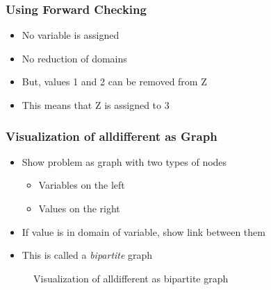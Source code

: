 \begin{frame}
\frametitle{Using Forward Checking}
\begin{itemize}
\item No variable is assigned
\item No reduction of domains
\item But, values 1 and 2 can be removed from Z
\item This means that Z is assigned to 3
\end{itemize}
\end{frame}

\begin{frame}
\frametitle{Visualization of alldifferent as Graph}
\begin{itemize}
\item Show problem as graph with two types of nodes
\begin{itemize}
\item Variables on the left
\item Values on the right
\end{itemize}
\item If value is in domain of variable, show link between them
\item This is called a {\em bipartite} graph
\end{itemize}
\end{frame}

\begin{figure}[ht]
\caption{Visualization of alldifferent as bipartite graph}
\begin{center}

\end{center}
\end{figure}


